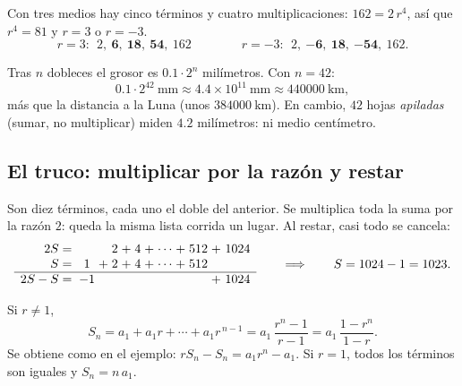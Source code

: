 \documentclass[11pt,a4paper]{article}
\begin{document}
\begin{ejemplo}
Con tres medios hay cinco términos y cuatro multiplicaciones: $162=2\,r^{4}$, así que $r^{4}=81$ y $r=3$ o $r=-3$.
\[ r=3:\ \ 2,\ \mathbf{6},\ \mathbf{18},\ \mathbf{54},\ 162\qquad\qquad r=-3:\ \ 2,\ \mathbf{-6},\ \mathbf{18},\ \mathbf{-54},\ 162 . \]
\end{ejemplo}

\begin{ejemplo}
Tras $n$ dobleces el grosor es $0.1\cdot 2^{n}$ milímetros. Con $n=42$:
\[ 0.1\cdot 2^{42}\ \si{\milli\metre}\approx 4.4\times10^{11}\ \si{\milli\metre}\approx\SI{440000}{\kilo\metre}, \]
más que la distancia a la Luna (unos $\SI{384000}{\kilo\metre}$). En cambio, $42$ hojas \emph{apiladas} (sumar, no
multiplicar) miden $4.2$ milímetros: ni medio centímetro.
\end{ejemplo}


\subsection{El truco: multiplicar por la razón y restar}
\begin{ejemplo}[$1+2+4+\cdots+512$]
Son diez términos, cada uno el doble del anterior. Se multiplica toda la suma por la razón $2$: queda la misma lista
corrida un lugar. Al restar, casi todo se cancela:
\[
\begin{array}{r@{\;}c@{\;}c@{\;}c@{\;}c@{\;}c@{\;}c@{\;}c@{\;}c@{\;}c@{\;}c}
2S={} &   & & 2 &+& 4 &+& \cdots &+& 512 &+\ 1024\\
S={} & 1 &+& 2 &+& 4 &+& \cdots &+& 512 & \\ \hline
2S-S={} & -1 & & & & & & & & & +\ 1024
\end{array}
\qquad\Longrightarrow\qquad S=1024-1=1023 .
\]
\end{ejemplo}
\begin{propiedad}
Si $r\neq1$,
\[ S_n=a_1+a_1r+\cdots+a_1r^{\,n-1}=a_1\,\frac{r^{n}-1}{r-1}=a_1\,\frac{1-r^{n}}{1-r}. \]
Se obtiene como en el ejemplo: $rS_n-S_n=a_1r^{n}-a_1$. Si $r=1$, todos los términos son iguales y $S_n=n\,a_1$.
\end{propiedad}
\end{document}
